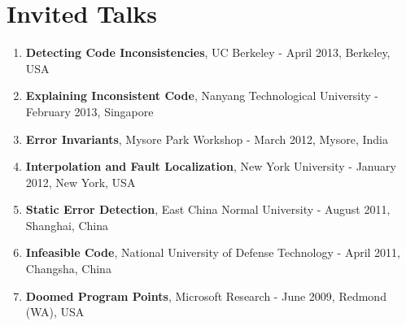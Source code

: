 \section{\sc Invited Talks}
\begin{enumerate}
\item \textbf{Detecting Code Inconsistencies}, UC Berkeley - April 2013, Berkeley, USA
\item \textbf{Explaining Inconsistent Code}, Nanyang Technological University - February 2013, Singapore 
\item \textbf{Error Invariants}, Mysore Park Workshop - March 2012, Mysore, India
\item \textbf{Interpolation and Fault Localization}, New York University - January 2012, New York, USA
\item \textbf{Static Error Detection}, East China Normal University - August 2011, Shanghai, China
\item \textbf{Infeasible Code}, National University of Defense Technology - April 2011, Changsha, China
\item \textbf{Doomed Program Points}, Microsoft Research - June 2009, Redmond (WA), USA
\end{enumerate}
